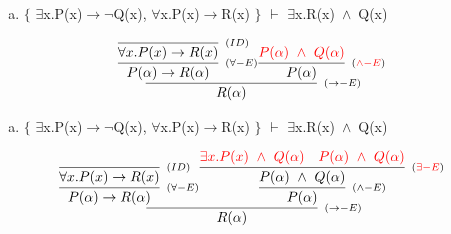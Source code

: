 \documentclass[aspectratio=43]{beamer}
\newcommand{\ria}{$\rightarrow$}
\newcommand{\fall}{$\forall$}
\newcommand{\ex}{$\exists$}
\newcommand{\nao}{$\neg$}
\newcommand{\andd}{$\wedge$}
\begin{document}
    \begin{frame}[fragile]
    
    	\begin{enumerate}[d)]
			\item $\{$ \ex x.P(x)\ria \nao Q(x), \fall x.P(x)\ria R(x) $\}$ $\vdash$ \ex x.R(x)\ \andd\ Q(x) \\
		\end{enumerate}
        
        \vspace{70pt}
        
        \[
        \begin{array}{c}
		
        	\infer[_{(\to -E)}]
            	{R(\alpha)}
            	{\infer[_{(\forall -E)}]
                	{P(\alpha) \rightarrow R(\alpha)} 
                    {\infer[_{(ID)}]
                    	{\forall x.P(x)\to R(x)}
                    	{}
                    }  
            	\infer[_{(\textcolor{red}{\land -E})}] 
                	{P(\alpha)}
                    {\textcolor{red}{P(\alpha)\ \land \ Q(\alpha)}}
                }
		\end{array}
        \]
        
	\end{frame}
    
    \begin{frame}[fragile]
    
    	\begin{enumerate}[d)]
			\item $\{$ \ex x.P(x)\ria \nao Q(x), \fall x.P(x)\ria R(x) $\}$ $\vdash$ \ex x.R(x)\ \andd\ Q(x) \\
		\end{enumerate}
        
        \vspace{65pt}
        
        \[
        \begin{array}{c}
		
        	\infer[_{(\to -E)}]
            	{R(\alpha)}
            	{\infer[_{(\forall -E)}]
                	{P(\alpha) \rightarrow R(\alpha)} 
                    {\infer[_{(ID)}]
                    	{\forall x.P(x)\to R(x)}
                    	{}
                    }  
            	\infer[_{(\land -E)}] 
                	{P(\alpha)}
                    {\infer[_{(\textcolor{red}{\exists -E})}]
                    	{P(\alpha)\ \land \ Q(\alpha)}
                    	{\textcolor{red}{\exists x.P(x)\ \land \ Q(\alpha)}
                        \hspace{10pt}
                        \textcolor{red}{P(\alpha)\ \land \ Q(\alpha)}
                        }
                    }
                }
		\end{array}
        \]
        
	\end{frame}
    
\end{document}
